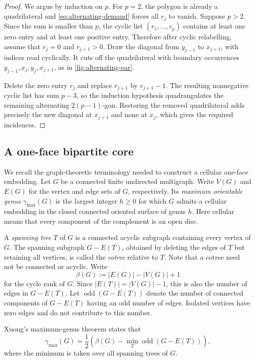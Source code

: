 \documentclass[11pt]{amsart}
\theoremstyle{definition}
\theoremstyle{plain}
\theoremstyle{definition}
\theoremstyle{definition}
\begin{document}
\begin{proof}
We argue by induction on $p$.  For $p=2$, the polygon is already a
quadrilateral and \eqref{eq:alternating-demand} forces all $r_j$ to vanish.
Suppose $p>2$. Since the sum is smaller than $p$, the cyclic list $(r_1,\ldots,r_p)$ contains at least one zero entry and at least one
positive entry. Therefore after cyclic
relabelling, assume that $r_j=0$ and $r_{j+1}>0$.  Draw the diagonal from
$y_{j-1}$ to $x_{j+1}$, with indices read cyclically.  It cuts off the
quadrilateral with boundary occurrences
$y_{j-1},x_j,y_j,x_{j+1}$, as in \cref{fig:alternating-ear}.

Delete the zero entry $r_j$ and replace $r_{j+1}$ by $r_{j+1}-1$.  The
resulting nonnegative cyclic list has sum $p-3$, so the induction hypothesis
quadrangulates the remaining alternating $2(p-1)$-gon.  Restoring the removed
quadrilateral adds precisely the new diagonal at $x_{j+1}$ and none at $x_j$,
which gives the required incidences.
\end{proof}

\subsection{A one-face bipartite core}

We recall the graph-theoretic terminology needed to construct a
cellular one-face embedding.  Let $G$ be a connected finite undirected
multigraph. Write $V(G)$ and $E(G)$ for the vertex and edge sets of $G$,
respectively.
Its \emph{maximum orientable genus} $\gamma_{\max}(G)$ is the largest
integer $h\geq0$ for which $G$ admits a cellular embedding in the closed
connected oriented surface of genus $h$.  Here cellular means that
every component of the complement is an open disc.

A \emph{spanning tree} $T$ of $G$ is a connected acyclic subgraph
containing every vertex of $G$.  The spanning subgraph $G-E(T)$,
obtained by deleting the edges of $T$ but retaining all vertices,
is called the \emph{cotree} relative to $T$. Note that a cotree need not be connected
or acyclic.  Write
\[
  \beta(G):=|E(G)|-|V(G)|+1
\]
for the cycle rank of $G$.  Since $|E(T)|=|V(G)|-1$, this is also the
number of edges in $G-E(T)$.  Let
$\operatorname{odd}(G-E(T))$ denote the number of connected components
of $G-E(T)$ having an odd number of edges.  Isolated vertices have
zero edges and do not contribute to this number.

Xuong's maximum-genus theorem \cite{Xuong} states that
\begin{equation}
\label{eq:Xuong}
  \gamma_{\max}(G)
  =
  \frac12\left(
    \beta(G)-\min_T\operatorname{odd}(G-E(T))
  \right),
\end{equation}
where the minimum is taken over all spanning trees of $G$.
\end{document}
